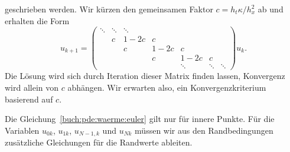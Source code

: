 geschrieben werden.
Wir kürzen den gemeinsamen Faktor $c=h_t\kappa/h_x^2$ ab und erhalten
die Form
\[
u_{k+1}
=
\begin{pmatrix}
\ddots&\ddots&\ddots&    &      &      &      \\
      &     c&  1-2c&  c &      &      &      \\
      &      &    c &1-2c&  c   &      &      \\
      &      &      &  c &1-2c  &  c   &      \\
      &      &      &    &\ddots&\ddots&\ddots
\end{pmatrix}
u_k.
\]
Die Lösung wird sich durch Iteration dieser Matrix finden lassen,
Konvergenz wird allein von $c$ abhängen.
Wir erwarten also, ein Konvergenzkriterium basierend auf $c$.

Die Gleichung~\eqref{buch:pde:waerme:euler} gilt nur für innere Punkte.
Für die Variablen $u_{0k}$, $u_{1k}$, $u_{N-1,k}$ und $u_{Nk}$ müssen
wir aus den Randbedingungen zusätzliche Gleichungen für die Randwerte
ableiten.

